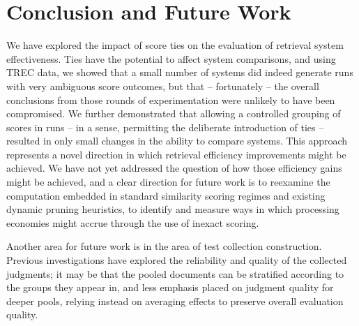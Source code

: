 \section{Conclusion and Future Work}
\label{sec-conclusion}

We have explored the impact of score ties on the evaluation of
retrieval system effectiveness.
Ties have the potential to affect system comparisons, and using TREC
data, we showed that a small number of systems did indeed generate
runs with very ambiguous score outcomes, but that -- fortunately --
the overall conclusions from those rounds of experimentation were
unlikely to have been compromised.
We further demonstrated that allowing a controlled grouping of scores
in runs -- in a sense, permitting the deliberate introduction of ties
-- resulted in only small changes in the ability to compare systems.
This approach represents a novel direction in which retrieval
efficiency improvements might be achieved.
We have not yet addressed the question of how those efficiency gains
might be achieved, and a clear direction for future work is to
reexamine the computation embedded in standard similarity scoring
regimes and existing dynamic pruning heuristics, to identify and
measure ways in which processing economies might accrue through the
use of inexact scoring.

Another area for future work is in the area of test collection
construction.
Previous investigations
{\citep{voorhees00ipm,bcstvy08sigir,sst11sigir}} have explored the
reliability and quality of the collected judgments; it may be that
the pooled documents can be stratified according to the groups they
appear in, and less emphasis placed on judgment quality for deeper
pools, relying instead on averaging effects to preserve overall
evaluation quality.





